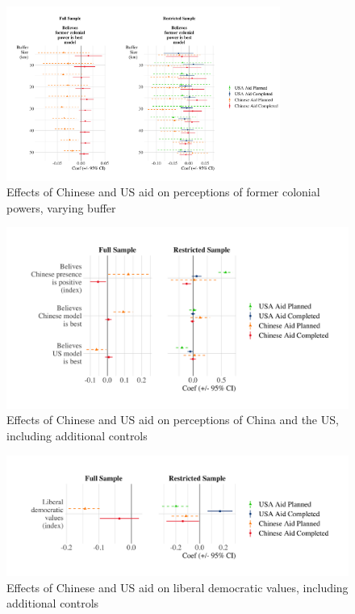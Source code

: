 \documentclass[9pt]{article}
\begin{document}
\begin{figure}[H]
\centering
\includegraphics[width=0.8\textwidth]{figures/figure_a12.png}
\caption{Effects of Chinese and US aid on perceptions of former colonial powers, varying buffer}
\end{figure}

\begin{figure}[H]
\centering
\includegraphics[width=1\textwidth]{figures/figure_a13.png}
\caption{Effects of Chinese and US aid on perceptions of China and the US, including additional controls}
\end{figure}

\begin{figure}[H]
\centering
\includegraphics[width=1\textwidth]{figures/figure_a14.png}
\caption{Effects of Chinese and US aid on liberal democratic values, including additional controls}
\end{figure}
\end{document}
